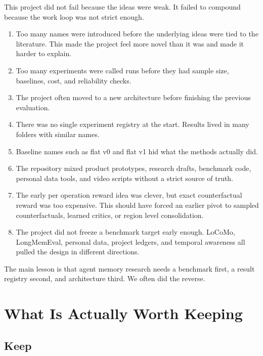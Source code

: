 \documentclass[11pt]{article}
\begin{document}
This project did not fail because the ideas were weak. It failed to compound because the work loop was not strict enough.

\begin{enumerate}
  \item Too many names were introduced before the underlying ideas were tied to the literature. This made the project feel more novel than it was and made it harder to explain.
  \item Too many experiments were called runs before they had sample size, baselines, cost, and reliability checks.
  \item The project often moved to a new architecture before finishing the previous evaluation.
  \item There was no single experiment registry at the start. Results lived in many folders with similar names.
  \item Baseline names such as flat v0 and flat v1 hid what the methods actually did.
  \item The repository mixed product prototypes, research drafts, benchmark code, personal data tools, and video scripts without a strict source of truth.
  \item The early per operation reward idea was clever, but exact counterfactual reward was too expensive. This should have forced an earlier pivot to sampled counterfactuals, learned critics, or region level consolidation.
  \item The project did not freeze a benchmark target early enough. LoCoMo, LongMemEval, personal data, project ledgers, and temporal awareness all pulled the design in different directions.
\end{enumerate}

The main lesson is that agent memory research needs a benchmark first, a result registry second, and architecture third. We often did the reverse.

\section{What Is Actually Worth Keeping}

\subsection{Keep}
\end{document}

